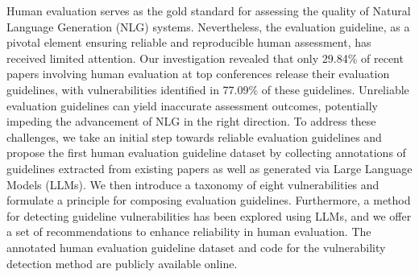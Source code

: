 Human evaluation serves as the gold standard for assessing the quality of Natural Language Generation (NLG) systems. Nevertheless, the evaluation guideline, as a pivotal element ensuring reliable and reproducible human assessment, has received limited attention. Our investigation revealed that only 29.84\% of recent papers involving human evaluation at top conferences release their evaluation guidelines, with vulnerabilities identified in 77.09\% of these guidelines. Unreliable evaluation guidelines can yield inaccurate assessment outcomes, potentially impeding the advancement of NLG in the right direction. To address these challenges, we take an initial step towards reliable evaluation guidelines and propose the first human evaluation guideline dataset by collecting annotations of guidelines extracted from existing papers as well as generated via Large Language Models (LLMs). We then introduce a taxonomy of eight vulnerabilities and formulate a principle for composing  evaluation guidelines. Furthermore, a method for detecting guideline vulnerabilities has been explored using LLMs, and we offer a set of recommendations to enhance reliability in human evaluation. The annotated human evaluation guideline dataset and code for the vulnerability detection method are publicly available online.